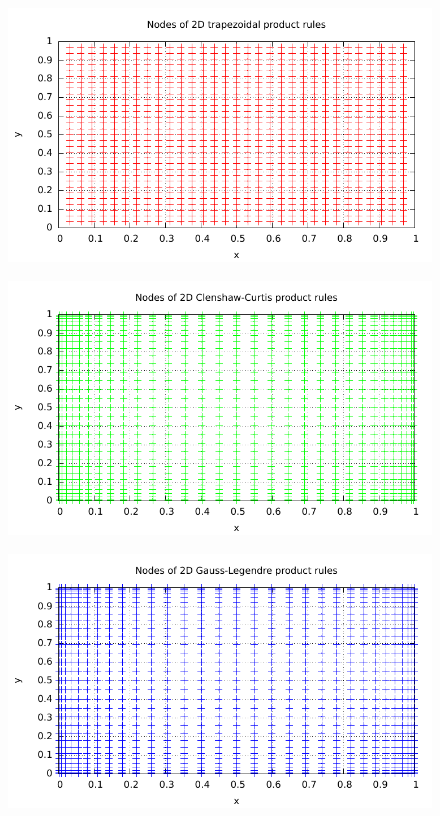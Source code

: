 \documentclass{article}
\begin{document}
\begin{figure}[htbp]
  \centering
     \includegraphics[width=1.0\textwidth]{../Task09/sh3_task9_point_plot_trapezoidal.pdf}
\end{figure}
\newpage
\begin{figure}[htbp]
  \centering
     \includegraphics[width=1.0\textwidth]{../Task09/sh3_task9_point_plot_clenshawCurtis.pdf}
\end{figure}

\begin{figure}[htbp]
  \centering
     \includegraphics[width=1.0\textwidth]{../Task09/sh3_task9_point_plot_gaussLegendre.pdf}
\end{figure}
\newpage
\end{document}
